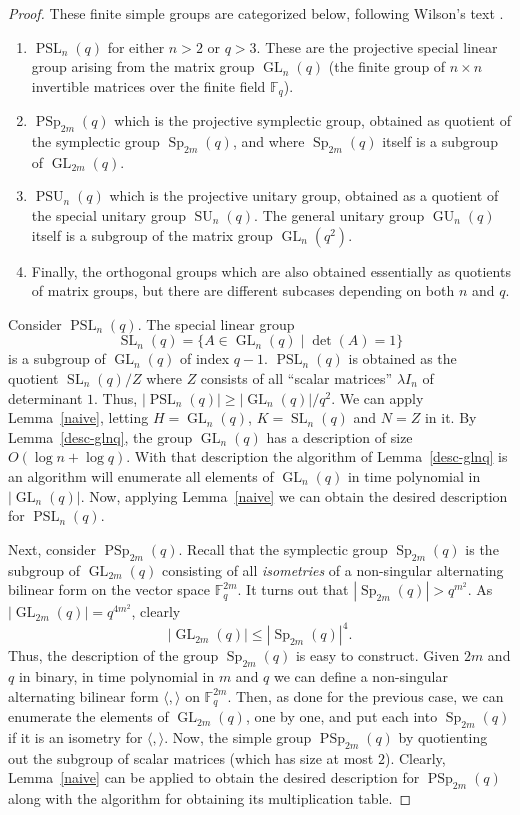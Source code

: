 \documentclass{elsarticle}
\newcommand{\GL}{\mathop{\mathrm{GL}}\nolimits}
\newcommand{\PSL}{\mathop{\mathrm{PSL}}\nolimits}
\newcommand{\SL}{\mathop{\mathrm{SL}}\nolimits}
\newcommand{\GU}{\mathop{\mathrm{GU}}\nolimits}
\newcommand{\PSU}{\mathop{\mathrm{PSU}}\nolimits}
\newcommand{\SU}{\mathop{\mathrm{SU}}\nolimits}
\newcommand{\PSp}{\mathop{\mathrm{PSp}}\nolimits}
\newcommand{\Sp}{\mathop{\mathrm{Sp}}\nolimits}
\newcommand{\F}{\mathbb{F}}
\begin{document}
\begin{proof}
  These finite simple groups are categorized below, following Wilson's
  text \cite[Chapter 3]{Wilson-book}.
  \begin{enumerate}
  \item $\PSL_n(q)$ for either $n>2$ or $q>3$. These are the projective
    special linear group arising from the matrix group $\GL_n(q)$ (the
    finite group of $n\times n$ invertible matrices over the finite
    field $\F_q$).
  \item $\PSp_{2m}(q)$ which is the projective symplectic group,
    obtained as quotient of the symplectic group $\Sp_{2m}(q)$, and
    where $\Sp_{2m}(q)$ itself is a subgroup of $\GL_{2m}(q)$.
  \item $\PSU_n(q)$ which is the projective unitary group, obtained as
    a quotient of the special unitary group $\SU_n(q)$. The general
    unitary group $\GU_n(q)$ itself is a subgroup of the matrix group
    $\GL_n(q^2)$.
  \item Finally, the orthogonal groups which are also obtained
    essentially as quotients of matrix groups, but there are different
    subcases depending on both $n$ and $q$.
  \end{enumerate}

  Consider $\PSL_n(q)$. The special linear group
  $$\SL_n(q)=\{A\in\GL_n(q)\mid \det(A)=1\}$$ is a subgroup of
  $\GL_n(q)$ of index $q-1$. $\PSL_n(q)$ is obtained as the quotient
  $\SL_n(q)/Z$ where $Z$ consists of all ``scalar matrices''
  $\lambda I_n$ of determinant $1$. Thus,
  $|\PSL_n(q)|\ge |\GL_n(q)|/q^2$. We can apply Lemma~\ref{naive},
  letting $H=\GL_n(q)$, $K=\SL_n(q)$ and $N=Z$ in it.  By
  Lemma~\ref{desc-glnq}, the group $\GL_n(q)$ has a description of
  size $O(\log n + \log q)$. With that description the algorithm of
  Lemma~\ref{desc-glnq} is an algorithm will enumerate all elements of
  $\GL_n(q)$ in time polynomial in $|\GL_n(q)|$. Now, applying
  Lemma~\ref{naive} we can obtain the desired description for
  $\PSL_n(q)$.

  Next, consider $\PSp_{2m}(q)$. Recall that the symplectic group
  $\Sp_{2m}(q)$ is the subgroup of $\GL_{2m}(q)$ consisting of all
  \emph{isometries} of a non-singular alternating bilinear form on the
  vector space $\F_q^{2m}$. It turns out that $|\Sp_{2m}(q)|>q^{m^2}$.
  As $|\GL_{2m}(q)|=q^{4m^2}$, clearly
  \[
    |\GL_{2m}(q)|\le |\Sp_{2m}(q)|^4.
  \]
  Thus, the description of the group $\Sp_{2m}(q)$ is easy to
  construct.  Given $2m$ and $q$ in binary, in time polynomial in $m$
  and $q$ we can define a non-singular alternating bilinear form
  $\langle,\rangle$ on $\F_q^{2m}$. Then, as done for the previous case, we
  can enumerate the elements of $\GL_{2m}(q)$, one by one, and put each
  into $\Sp_{2m}(q)$ if it is an isometry for $\langle,\rangle$. Now, the
  simple group $\PSp_{2m}(q)$ by quotienting out the subgroup of scalar
  matrices (which has size at most $2$). Clearly, Lemma~\ref{naive}
  can be applied to obtain the desired description for $\PSp_{2m}(q)$
  along with the algorithm for obtaining its multiplication table.


\end{proof}
\end{document}
